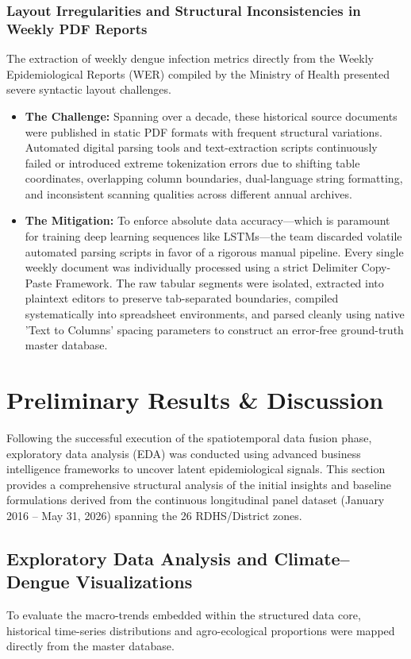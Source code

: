 \documentclass[12pt,a4paper]{article}
\begin{document}
\subsubsection{Layout Irregularities and Structural Inconsistencies in Weekly PDF Reports}
The extraction of weekly dengue infection metrics directly from the Weekly Epidemiological Reports (WER) compiled by the Ministry of Health presented severe syntactic layout challenges.

\begin{itemize}
    \item \textbf{The Challenge:} Spanning over a decade, these historical source documents were published in static PDF formats with frequent structural variations. Automated digital parsing tools and text-extraction scripts continuously failed or introduced extreme tokenization errors due to shifting table coordinates, overlapping column boundaries, dual-language string formatting, and inconsistent scanning qualities across different annual archives.
    \item \textbf{The Mitigation:} To enforce absolute data accuracy—which is paramount for training deep learning sequences like LSTMs—the team discarded volatile automated parsing scripts in favor of a rigorous manual pipeline. Every single weekly document was individually processed using a strict Delimiter Copy-Paste Framework. The raw tabular segments were isolated, extracted into plaintext editors to preserve tab-separated boundaries, compiled systematically into spreadsheet environments, and parsed cleanly using native 'Text to Columns' spacing parameters to construct an error-free ground-truth master database.
\end{itemize}

\clearpage
\section{Preliminary Results \& Discussion}
\label{sec:preliminary_results}

Following the successful execution of the spatiotemporal data fusion phase, exploratory data analysis (EDA) was conducted using advanced business intelligence frameworks to uncover latent epidemiological signals. This section provides a comprehensive structural analysis of the initial insights and baseline formulations derived from the continuous longitudinal panel dataset (January 2016 -- May 31, 2026) spanning the 26 RDHS/District zones.

\subsection{Exploratory Data Analysis and Climate--Dengue Visualizations}
To evaluate the macro-trends embedded within the structured data core, historical time-series distributions and agro-ecological proportions were mapped directly from the master database.
\end{document}
